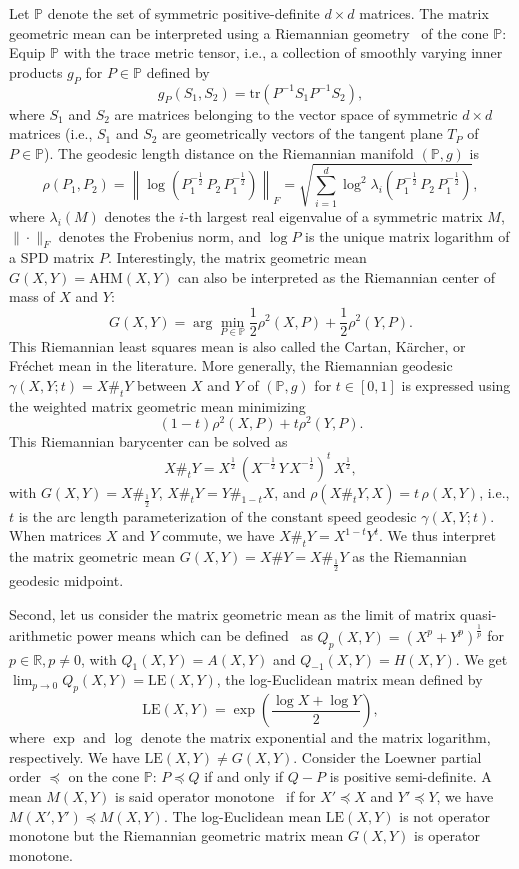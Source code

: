 \documentclass{article}
\def\correction#1{{\color{red}{#1}}}
\def\bbR{\mathbb{R}}
\def\AHM{\mathrm{AHM}}
\def\tr{\mathrm{tr}}
\def\LEM{\mathrm{LE}}
\def\bbP{\mathbb{P}}
\begin{document}
Let $\bbP$ denote the set of symmetric positive-definite $d\times d$ matrices. %
The matrix geometric mean can  be interpreted using a Riemannian geometry~\cite{bhatia2006riemannian} of the cone $\bbP$:
Equip $\bbP$ with the trace metric tensor, i.e., a collection of smoothly varying inner products $g_P$ for $P\in\bbP$ defined by
$$
g_P(S_1,S_2)=\tr\left(P^{-1} S_1 P^{-1} S_2\right),
$$ 
where $S_1$ and $S_2$ are matrices belonging to the vector space of symmetric $d\times d$ matrices (i.e., $S_1$ and $S_2$ are geometrically vectors  of the tangent plane $T_P$ of $P\in\bbP$).
The geodesic length distance on the Riemannian manifold $(\bbP,g)$ is
$$
\rho(P_1,P_2)=\left\| \log\left(P_1^{-\frac{1}{2}}\, P_2\, P_1^{-\frac{1}{2}}\right)\right\|_F  =\sqrt{\sum_{i=1}^d \log^2 \lambda_i\left(P_1^{-\frac{1}{2}}\, P_2\, P_1^{-\frac{1}{2}}\right)},
$$
where $\lambda_i(M)$ denotes the $i$-th largest real eigenvalue of a symmetric matrix $M$, $\|\cdot\|_F$ denotes the Frobenius norm, and $\log P$ is the unique matrix logarithm of a SPD matrix $P$.
Interestingly, the matrix geometric mean $G(X,Y)=\AHM(X,Y)$ can also  be interpreted as the Riemannian center of mass of $X$ and $Y$:
$$
G(X,Y)=\arg\min_{P\in\bbP} \frac{1}{2}\rho^2(X,P)+\frac{1}{2}\rho^2(Y,P).
$$
This  Riemannian least squares mean is also called the Cartan, K\"archer, or Fr\'echet mean in the literature.
More generally, the Riemannian geodesic $\gamma(X,Y;t)=X\#_t Y$ between $X$ and $Y$ of $(\bbP,g)$ for $t\in [0,1]$ is expressed using the weighted matrix geometric mean \correction{$G(X,Y;1-t,t)=X\#_t Y$} minimizing
$$
(1-t) \rho^2(X,P)+t\rho^2(Y,P).
$$
This Riemannian barycenter can be solved as
$$
X\#_t Y= 
X^{\frac{1}{2}}\, \left(X^{-\frac{1}{2}}\, Y\, X^{-\frac{1}{2}}\right)^t\, X^{\frac{1}{2}},
$$
with $G(X,Y)=X\#_{\frac{1}{2}} Y$, $X\#_t Y=Y\#_{1-t} X$, and $\rho(X\#_t Y,X)=t\, \rho(X,Y)$, i.e., $t$ is the arc length parameterization of the constant speed geodesic $\gamma(X,Y;t)$. When matrices $X$ and $Y$ commute, we have $X\#_t Y=X^{1-t}Y^t$.
We thus interpret the matrix geometric mean $G(X,Y)=X\#Y=X\#_{\frac{1}{2}} Y$ as the Riemannian geodesic midpoint.

 


Second, let us consider the matrix geometric mean as the limit of  matrix quasi-arithmetic power means which can be  defined~\cite{lim2012matrix} as $Q_p(X,Y)=(X^p+Y^p)^{\frac{1}{p}}$ for $p\in\bbR, p\not=0$, with 
$Q_1(X,Y)=A(X,Y)$ and $Q_{-1}(X,Y)=H(X,Y)$.
We get $\lim_{p\rightarrow 0} Q_p(X,Y)=\LEM(X,Y)$, the log-Euclidean matrix mean defined by
$$
\LEM(X,Y)=\exp\left(\frac{\log X+\log Y}{2}\right),
$$
where $\exp$ and $\log$ denote the matrix exponential and  the matrix logarithm, respectively.
We have $\LEM(X,Y)\not =G(X,Y)$.
Consider the Loewner partial order $\preceq$ on the cone $\bbP$:
 $P\preceq Q$ if and only if $Q-P$ is positive semi-definite.
A mean $M(X,Y)$ is said operator monotone~\cite{bhatia2006riemannian} if for $X'\preceq X$ and $Y'\preceq Y$, we have
$M(X',Y')\preceq M(X,Y)$. 
The log-Euclidean mean $\LEM(X,Y)$ is not operator monotone but the Riemannian geometric matrix mean $G(X,Y)$ is operator monotone.
\end{document}
